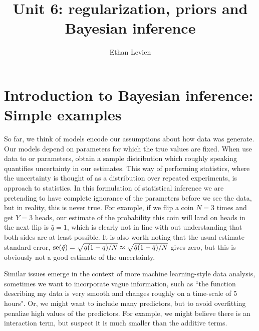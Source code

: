 


\setcounter{unit}{1}
\setcounter{section}{0}






\title{Unit 6: regularization, priors and Bayesian inference}
\author{Ethan Levien}
\maketitle


\section{Introduction to Bayesian inference: Simple examples}

So far, we think of models encode our assumptions about how data was generate. Our models depend on parameters for which the true values are fixed. When use data to  or  parameters, obtain a sample distribution which roughly speaking quantifies uncertainty in our estimates. This way of performing statistics, where the uncertainty is thought of as a distribution over repeated experiments, is  approach to statistics.  In this formulation of statistical inference we are pretending to have complete ignorance of the parameters before we see the data, but in reality, this is never true. For example, if we flip a coin $N=3$ times and get $Y=3$ heads, our estimate of the probability this coin will land on heads in the next flip is $\hat{q} = 1$, which is clearly not in line with out understanding that both sides are at least possible. It is also worth noting that the usual estimate standard error, ${\rm se}(\hat{q}) = \sqrt{q(1-q)/N} \approx  \sqrt{\hat{q} (1-\hat{q} )/N}$ gives zero, but this is obviously not a good estimate of the uncertainty. 

Similar issues emerge in the context of more machine learning-style data analysis, sometimes we want to incorporate vague information, such as ``the function describing my data is very smooth and changes roughly on a time-scale of 5 hours". Or, we might want to include many predictors, but to avoid overfitting penalize high values of the predictors. For example, we might believe there is an interaction term, but suspect it is much smaller than the additive terms. 


